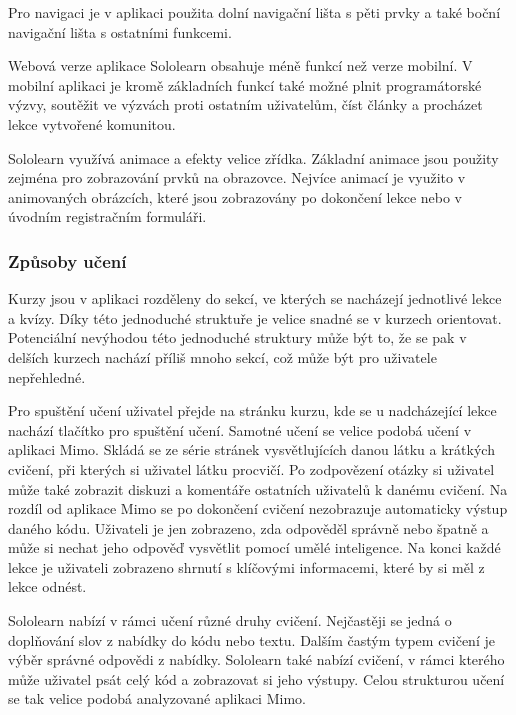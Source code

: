 Pro navigaci je v aplikaci použita dolní navigační lišta s pěti prvky a také boční navigační lišta s ostatními funkcemi. 


Webová verze aplikace Sololearn obsahuje méně funkcí než verze mobilní. V mobilní aplikaci je kromě základních funkcí také možné plnit programátorské výzvy, soutěžit ve výzvách proti ostatním uživatelům, číst články a procházet lekce vytvořené komunitou.  

Sololearn využívá animace a efekty velice zřídka. Základní animace jsou použity zejména pro zobrazování prvků na obrazovce. Nejvíce animací je využito v animovaných obrázcích, které jsou zobrazovány po dokončení lekce nebo v úvodním registračním formuláři.

\subsubsection{Způsoby učení}

Kurzy jsou v aplikaci rozděleny do sekcí, ve kterých se nacházejí jednotlivé lekce a kvízy. Díky této jednoduché struktuře je velice snadné se v kurzech orientovat. Potenciální nevýhodou této jednoduché struktury může být to, že se pak v delších kurzech nachází příliš mnoho sekcí, což může být pro uživatele nepřehledné.

Pro spuštění učení uživatel přejde na stránku kurzu, kde se u nadcházející lekce nachází tlačítko pro spuštění učení. Samotné učení se velice podobá učení v aplikaci Mimo. Skládá se ze série stránek vysvětlujících danou látku a krátkých cvičení, při kterých si uživatel látku procvičí. Po zodpovězení otázky si uživatel může také zobrazit diskuzi a komentáře ostatních uživatelů k danému cvičení. Na rozdíl od aplikace Mimo se po dokončení cvičení nezobrazuje automaticky výstup daného kódu. Uživateli je jen zobrazeno, zda odpověděl správně nebo špatně a může si nechat jeho odpověď vysvětlit pomocí umělé inteligence. Na konci každé lekce je uživateli zobrazeno shrnutí s klíčovými informacemi, které by si měl z lekce odnést.

Sololearn nabízí v rámci učení různé druhy cvičení. Nejčastěji se jedná o doplňování slov z nabídky do kódu nebo textu. Dalším častým typem cvičení je výběr správné odpovědi z nabídky. Sololearn také nabízí cvičení, v rámci kterého může uživatel psát celý kód a zobrazovat si jeho výstupy. Celou strukturou učení se tak velice podobá analyzované aplikaci Mimo.

